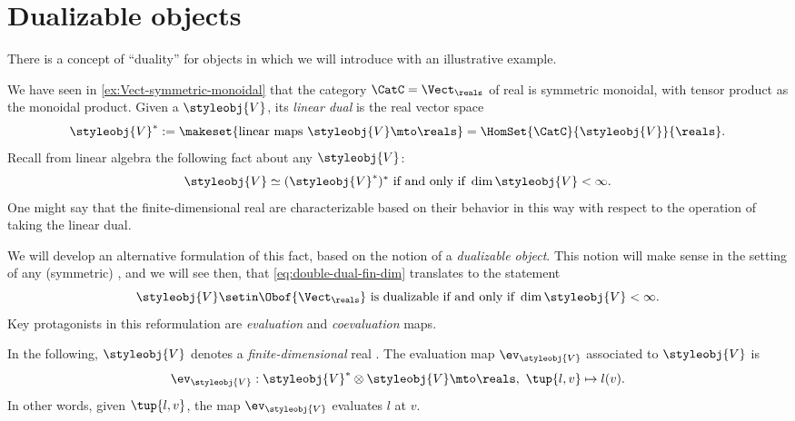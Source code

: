 
\section{Dualizable objects}
\label{sec:dual-objects}
There is a concept of ``duality'' for objects in  which we will introduce with an illustrative example.

We have seen in \cref{ex:Vect-symmetric-monoidal} that the category $\CatC = \Vect_{\reals}$ of real  is symmetric monoidal, with tensor product as the monoidal product.
Given a  $\styleobj{V} $, its \emph{linear dual} is the real vector space
\begin{equation}
    \label{eq:lin-dual-vecsp}
    \styleobj{V} ^{*} := \makeset{ \text{linear maps } \styleobj{V} \mto \reals } = \HomSet{\CatC}{\styleobj{V}}{ \reals}.
\end{equation}
%
Recall from linear algebra the following fact about any  $\styleobj{V} $:
%
\begin{equation}
    \label{eq:double-dual-fin-dim}
    \styleobj{V}  \simeq (\styleobj{V} ^{*})^* \text{ if and only if } \dim \styleobj{V}  < \infty.
\end{equation}
%
One might say that the finite-dimensional real  are characterizable based on their behavior in this way with respect to the operation of taking the linear dual.

We will develop an alternative formulation of this fact, based on the notion of a \emph{dualizable object}.
This notion will make sense in the setting of any (symmetric) , and we will see then, that \cref{eq:double-dual-fin-dim} translates to the statement
\begin{equation}
    \label{eq:dualizable-fin-dim}
    \styleobj{V}  \setin \Obof{\Vect_\reals} \text{ is dualizable if and only if } \dim \styleobj{V}  < \infty.
\end{equation}
%
Key protagonists in this reformulation are \emph{evaluation} and \emph{coevaluation} maps.

In the following,  $\styleobj{V} $ denotes a \emph{finite-dimensional} real .
The evaluation map $\ev_\styleobj{V} $ associated to $\styleobj{V} $ is
\begin{equation}
    \label{eq:evaluation-vecsp}
    \ev_\styleobj{V}  : \styleobj{V}^* \otimes \styleobj{V}  \mto \reals, \ \tup{l, v} \mapsto l(v).
\end{equation}
In other words, given $\tup{l, v}$, the map $\ev_\styleobj{V} $ evaluates $l$ at $v$.

